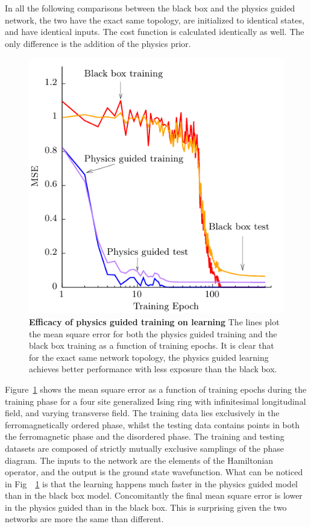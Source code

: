 In all the following comparisons between the black box and the physics guided
network, the two have the exact same topology, are initialized to identical
states, and have identical inputs. The cost function is calculated identically
as well. The only difference is the addition of the physics prior.

\begin{figure}
	\includegraphics{figures/4-site-gs-mse.pdf}
	\caption{\textbf{Efficacy of physics guided training on learning} The lines 
	plot the mean square error for both the physics guided training 
 	and the black box training as a function of training epochs. 
	It is clear that for the exact same network topology, the 
	physics guided learning achieves better performance with 
	less exposure than the black box.}	
	\label{4-site-gs-mse}
\end{figure}

Figure~\ref{4-site-gs-mse} shows the mean square error as a function of training
epochs during the training phase for a four site generalized Ising ring with 
infinitesimal longitudinal field, and varying transverse field. The training 
data lies exclusively in the ferromagnetically ordered phase, whilst the 
testing data contains points in both the ferromagnetic phase and the 
disordered phase. The training and testing datasets are composed of strictly 
mutually exclusive samplings of the phase diagram. The inputs to the network 
are the elements of the Hamiltonian operator, and the output is the 
ground state wavefunction. What can be noticed in Fig~~\ref{4-site-gs-mse} is 
that the learning happens much faster in the physics guided model than in the 
black box model. Concomitantly the final mean square error is lower in the 
physics guided than in the black box. This is surprising given the two 
networks are more the same than different. 


